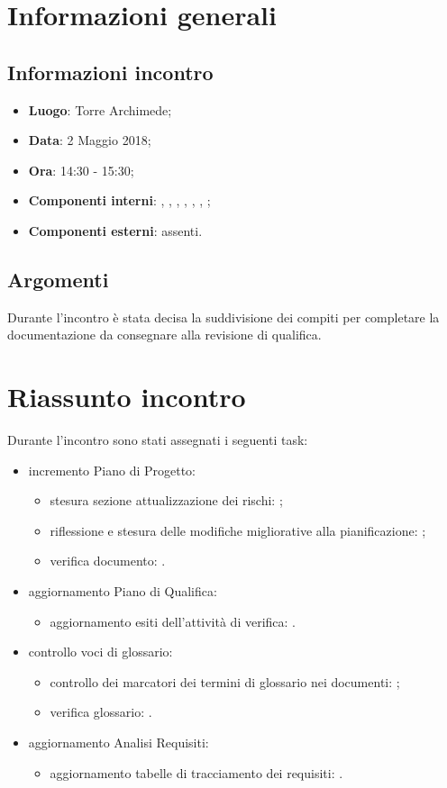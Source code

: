 \section{Informazioni generali}
\subsection{Informazioni incontro}
\begin{itemize}
\item \textbf{Luogo}: Torre Archimede;
\item \textbf{Data}: 2 Maggio 2018;
\item \textbf{Ora}: 14:30 - 15:30;
\item \textbf{Componenti interni}: \Tommaso, \Carlo, \Isacco, \Mattia, \Luca, \Cristian, \Leonardo;
\item \textbf{Componenti esterni}: assenti.
\end{itemize}

\subsection{Argomenti}
Durante l'incontro è stata decisa la suddivisione dei compiti per completare la documentazione da consegnare alla revisione di qualifica.

\section{Riassunto incontro}

Durante l'incontro sono stati assegnati i seguenti task:	
\begin{itemize}
	\item incremento Piano di Progetto:
	\begin{itemize}
		\item stesura sezione attualizzazione dei rischi: \Isacco{};
		\item riflessione e stesura delle modifiche migliorative alla pianificazione: \Isacco{};
		\item verifica documento: \Isacco{}.
	\end{itemize}
	\item aggiornamento Piano di Qualifica:
	\begin{itemize}
		\item aggiornamento esiti dell'attività di verifica: \Luca{}.
	\end{itemize}
	\item controllo voci di glossario:
	\begin{itemize}
		\item controllo dei marcatori dei termini di glossario nei documenti: \Tommaso{};
		\item verifica glossario: \Cristian{}.
	\end{itemize}
	\item aggiornamento Analisi Requisiti:
	\begin{itemize}
		\item aggiornamento tabelle di tracciamento dei requisiti: \Leonardo{}.
	\end{itemize}
\end{itemize}

